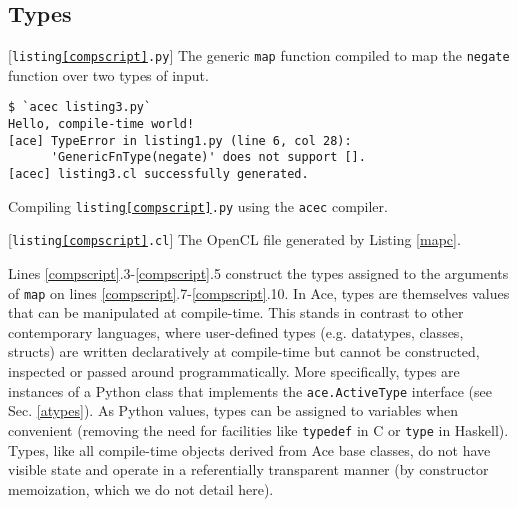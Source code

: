 \documentclass[10pt,preprint]{sigplanconf}
\begin{document}
{\subsection{Types}
\begin{codelisting}

\caption{[\texttt{listing\ref{compscript}.py}] The generic \texttt{map} function compiled to map the \texttt{negate} function over two  types of input.}
\label{compscript}
\end{codelisting}
\begin{codelisting}
\begin{lstlisting}[style=Bash]
$ `acec listing3.py`
Hello, compile-time world!
[ace] TypeError in listing1.py (line 6, col 28): 
      'GenericFnType(negate)' does not support [].
[acec] listing3.cl successfully generated.
\end{lstlisting}
\caption{Compiling \texttt{listing\ref{compscript}.py} using the \texttt{acec} compiler.}
\label{mapc}
\end{codelisting}
\begin{codelisting}

\caption{[\texttt{listing\ref{compscript}.cl}] The OpenCL file generated by Listing \ref{mapc}.}
\label{mapout}
\end{codelisting}
Lines \ref{compscript}.3-\ref{compscript}.5 construct the types assigned to the arguments of \verb|map| on lines \ref{compscript}.7-\ref{compscript}.10. In Ace, types are themselves values that can be manipulated at compile-time. This stands in contrast to other contemporary languages, where user-defined types (e.g. datatypes, classes, structs) are written declaratively at compile-time but cannot be constructed, inspected or passed around programmatically. More specifically, types are instances of a Python class that implements the \verb|ace.ActiveType| interface (see Sec. \ref{atypes}). 
As Python values, types can be assigned to variables when convenient (removing the need for  facilities like \verb|typedef| in C or \verb|type| in Haskell). Types, like all compile-time objects derived from Ace base classes, do not have visible state and operate in a referentially transparent manner (by constructor memoization, which we do not detail here).%

}
\end{document}
